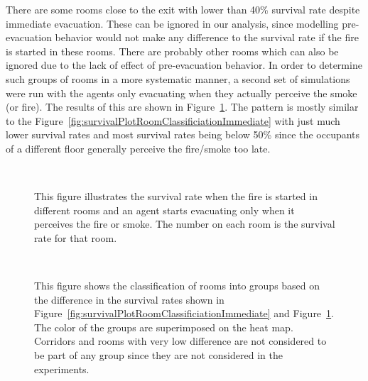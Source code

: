 There are some rooms close to the exit with lower than 40\% survival rate despite immediate evacuation. These can be ignored in our analysis, since modelling pre-evacuation behavior would not make any difference to the survival rate if the fire is started in these rooms. There are probably other rooms which can also be ignored due to the lack of effect of pre-evacuation behavior. In order to determine such groups of rooms in a more systematic manner, a second set of simulations were run with the agents only evacuating when they actually perceive the smoke (or fire). The results of this are shown in Figure~\ref{fig:survivalPlotRoomClassificationDelayed}. The pattern is mostly similar to the Figure~\ref{fig:survivalPlotRoomClassificiationImmediate} with just much lower survival rates and most survival rates being below 50\% since the occupants of a different floor generally perceive the fire/smoke too late.


\begin{figure}[!tbp]
\centering
{}
\\
\caption[Delayed Evacuation Survival Rate Heat Map]{This figure illustrates the survival rate when the fire is started in different rooms and an agent starts evacuating only when it perceives the fire or smoke. The number on each room is the survival rate for that room.}
\label{fig:survivalPlotRoomClassificationDelayed}
\end{figure}


\begin{figure}[!tbp]
\centering
{}
\\
\caption[Survival Rate Difference Heat Map]{This figure shows the classification of rooms into groups based on the difference in the survival rates shown in Figure~\ref{fig:survivalPlotRoomClassificiationImmediate} and Figure~\ref{fig:survivalPlotRoomClassificationDelayed}. The color of the groups are superimposed on the heat map. Corridors and rooms with very low difference are not considered to be part of any group since they are not considered in the experiments.}
\label{fig:survivalPlotRoomClassificationDiff}
\end{figure}

